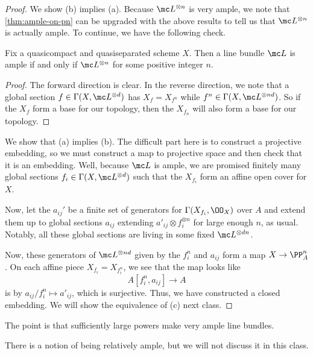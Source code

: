 \documentclass[../notes.tex]{subfiles}
\begin{document}
\begin{proof}
	We show (b) implies (a). Because $\mc L^{\otimes n}$ is very ample, we note that \autoref{thm:ample-on-pn} can be upgraded with the above results to tell us that $\mc L^{\otimes n}$ is actually ample. To continue, we have the following check.
	\begin{lemma}
		Fix a quasicompact and quasiseparated scheme $X$. Then a line bundle $\mc L$ is ample if and only if $\mc L^{\otimes n}$ for some positive integer $n$.
	\end{lemma}
	\begin{proof}
		The forward direction is clear. In the reverse direction, we note that a global section $f\in\Gamma(X,\mc L^{\otimes d})$ has $X_f=X_{f^n}$ while $f^n\in\Gamma(X,\mc L^{\otimes nd})$. So if the $X_f$ form a base for our topology, then the $X_{f_n}$ will also form a base for our topology.
	\end{proof}
	We show that (a) implies (b). The difficult part here is to construct a projective embedding, so we must construct a map to projective space and then check that it is an embedding. Well, because $\mc L$ is ample, we are promised finitely many global sections $f_i\in\Gamma(X,\mc L^{\otimes d})$ such that the $X_{f_i}$ form an affine open cover for $X$.

	Now, let the $a_{ij}'$ be a finite set of generators for $\Gamma(X_{f_i},\OO_X)$ over $A$ and extend them up to global sections $a_{ij}$ extending $a'_{ij}\otimes f_i^{\otimes n}$ for large enough $n$, as usual. Notably, all these global sections are living in some fixed $\mc L^{\otimes dn}$.

	Now, these generators of $\mc L^{\otimes nd}$ given by the $f_i^n$ and $a_{ij}$ form a map $X\to\PP^n_A$. On each affine piece $X_{f_i}=X_{f_i^n}$, we see that the map looks like
	\[A[f_i^n,a_{ij}]\to A\]
	is by $a_{ij}/f_i^n\mapsto a'_{ij}$, which is surjective. Thus, we have constructed a closed embedding. We will show the equivalence of (c) next class.
\end{proof}
The point is that sufficiently large powers make very ample line bundles.
\begin{remark}
	There is a notion of being relatively ample, but we will not discuss it in this class.
\end{remark}
\end{document}
